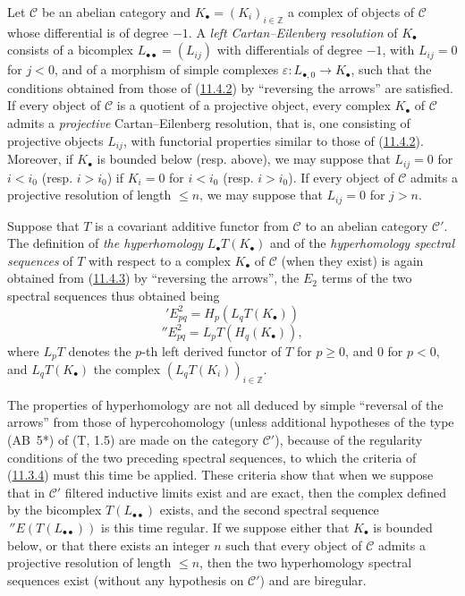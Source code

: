 \begin{env}[11.6.1]
\label{0.11.6.1}
Let $\mathcal C$ be an abelian category and
$K_\bullet=(K_i)_{i\in\mathbb Z}$ a complex of objects of $\mathcal C$ whose
differential is of degree $-1$. A \emph{left Cartan--Eilenberg
resolution} of $K_\bullet$ consists of a bicomplex
$L_{\bullet\bullet}=(L_{ij})$ with differentials of degree $-1$, with
$L_{ij}=0$ for $j<0$, and of a morphism of simple complexes
$\varepsilon:L_{\bullet,0}\to K_\bullet$, such that the conditions obtained
from those of (\hyperref[0.11.4.2]{11.4.2}) by ``reversing the
arrows'' are satisfied. If every object of $\mathcal C$ is a quotient of a
projective object, every complex $K_\bullet$ of $\mathcal C$ admits a
\emph{projective} Cartan--Eilenberg resolution, that is, one consisting of
projective objects $L_{ij}$, with functorial properties similar to those of
(\hyperref[0.11.4.2]{11.4.2}). Moreover, if $K_\bullet$ is bounded
below (resp. above), we may suppose that $L_{ij}=0$ for
$i<i_0$ (resp. $i>i_0$) if $K_i=0$ for $i<i_0$ (resp. $i>i_0$). If every
object of $\mathcal C$ admits a projective resolution of length $\leq n$,
we may suppose that $L_{ij}=0$ for $j>n$.
\end{env}

\begin{env}[11.6.2]
\label{0.11.6.2}
Suppose that $T$ is a covariant additive functor from $\mathcal C$ to an
abelian category $\mathcal C'$. The definition of
\emph{the hyperhomology} $L_\bullet T(K_\bullet)$ and of the \emph{hyperhomology
spectral sequences} of $T$ with respect to a complex $K_\bullet$ of
$\mathcal C$ (when they exist) is again obtained from
(\hyperref[0.11.4.3]{11.4.3}) by ``reversing the arrows'', the $E_2$
terms of the two spectral sequences thus obtained being
\[
\label{0.11.6.2.1}
\tag{11.6.2.1}
{}'E^2_{pq}=H_p(L_qT(K_\bullet))
\]
\[
\label{0.11.6.2.2}
\tag{11.6.2.2}
{}''E^2_{pq}=L_pT(H_q(K_\bullet)),
\]
where $L_pT$ denotes the $p$-th left derived functor of $T$ for $p\geq 0$, and $0$
for $p<0$, and $L_qT(K_\bullet)$ the complex
$(L_qT(K_i))_{i\in\mathbb Z}$.

The properties of hyperhomology are not all deduced by simple
``reversal of the arrows'' from those of hypercohomology (unless
additional hypotheses of the type (AB~5*) of (T, 1.5) are made on the
category $\mathcal C'$), because of the regularity conditions of the two
preceding spectral sequences, to which the criteria of
(\hyperref[0.11.3.4]{11.3.4}) must this time be applied. These criteria show that
when we suppose that in $\mathcal C'$ filtered inductive limits
exist and are exact, then the complex defined by the bicomplex
$T(L_{\bullet\bullet})$ exists, and the second spectral sequence
$\,{}''E(T(L_{\bullet\bullet}))$ is this time regular. If we suppose
either that $K_\bullet$ is bounded below, or that there exists an integer
$n$ such that every object of $\mathcal C$ admits a projective resolution of
length $\leq n$, then the two hyperhomology spectral sequences exist
(without any hypothesis on $\mathcal C'$) and are biregular.
\end{env}

